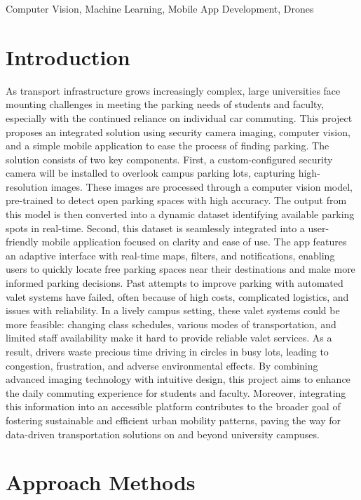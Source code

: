 \documentclass[conference]{IEEEtran}
\begin{document}
\begin{IEEEkeywords}
    Computer Vision, Machine Learning, Mobile App Development, Drones
\end{IEEEkeywords}

\section{Introduction}
As transport infrastructure grows increasingly complex, 
large universities face mounting challenges in meeting the parking needs of students and faculty, 
especially with the continued reliance on individual car commuting. 
This project proposes an integrated solution using security camera imaging, 
computer vision, 
and a simple mobile application to ease the process of finding parking. 
The solution consists of two key components. 
First, 
a custom-configured security camera will be installed to overlook campus parking lots,
capturing high-resolution images. 
These images are processed through a computer vision model, 
pre-trained to detect open parking spaces with high accuracy. 
The output from this model is then converted into a dynamic dataset identifying available parking spots in real-time. 
Second, 
this dataset is seamlessly integrated into a user-friendly mobile application focused on clarity and ease of use. 
The app features an adaptive interface with real-time maps, 
filters, 
and notifications, 
enabling users to quickly locate free parking spaces near their destinations and make more informed parking decisions. 
Past attempts to improve parking with automated valet systems have failed, 
often because of high costs, 
complicated logistics, 
and issues with reliability. 
In a lively campus setting, 
these valet systems could be more feasible: 
changing class schedules, 
various modes of transportation, 
and limited staff availability make it hard to provide reliable valet services. 
As a result, 
drivers waste precious time driving in circles in busy lots, 
leading to congestion, 
frustration, 
and adverse environmental effects. 
By combining advanced imaging technology with intuitive design, 
this project aims to enhance the daily commuting experience for students and faculty. 
Moreover, 
integrating this information into an accessible platform contributes to the broader goal of fostering sustainable and efficient urban mobility patterns, 
paving the way for data-driven transportation solutions on and beyond university campuses.

\section{Approach Methods}
\end{document}
